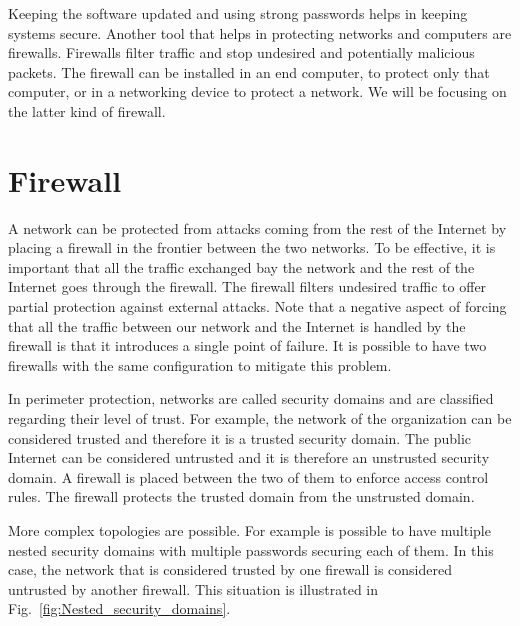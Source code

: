 Keeping the software updated and using strong passwords helps in keeping systems secure.
Another tool that helps in protecting networks and computers are firewalls.
Firewalls filter traffic and stop undesired and potentially malicious packets.
The firewall can be installed in an end computer, to protect only that computer, or in a networking device to protect a network.
We will be focusing on the latter kind of firewall.

\section{Firewall}

A network can be protected from attacks coming from the rest of the Internet by placing a firewall in the frontier between the two networks.
To be effective, it is important that all the traffic exchanged bay the network and the rest of the Internet goes through the firewall.
The firewall filters undesired traffic to offer partial protection against external attacks.
Note that a negative aspect of forcing that all the traffic between our network and the Internet is handled by the firewall is that it introduces a single point of failure.
It is possible to have two firewalls with the same configuration to mitigate this problem.

In perimeter protection, networks are called security domains and are classified regarding their level of trust.
For example, the network of the organization can be considered trusted and therefore it is a trusted security domain.
The public Internet can be considered untrusted and it is therefore an unstrusted security domain.
A firewall is placed between the two of them to enforce access control rules.
The firewall protects the trusted domain from the unstrusted domain.

More complex topologies are possible.
For example is possible to have multiple nested security domains with multiple passwords securing each of them.
In this case, the network that is considered trusted by one firewall is considered untrusted by another firewall.
This situation is illustrated in Fig.~\ref{fig:Nested_security_domains}.

